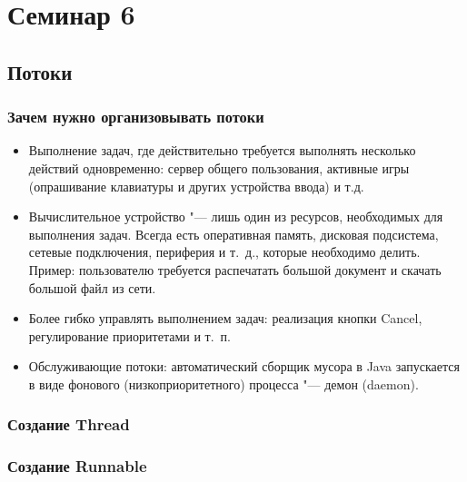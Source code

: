 \documentclass[default]{beamer}
\begin{document}
	\section{Семинар 6}
	\subsection{Потоки}
	\begin{frame}
		\frametitle{Зачем нужно организовывать потоки}
		
		\begin{itemize}
			\item Выполнение задач, где действительно требуется выполнять несколько действий одновременно: сервер общего пользования, активные игры (опрашивание клавиатуры и других устройства ввода) и т.д.
			\item Вычислительное устройство "--- лишь один из ресурсов, необходимых для выполнения задач. Всегда есть оперативная память, дисковая подсистема, сетевые подключения, периферия и т.~д., которые необходимо делить. Пример: пользователю требуется распечатать большой документ и скачать большой файл из сети.
			\item Более гибко управлять выполнением задач: реализация кнопки Cancel, регулирование приоритетами и т.~п.
			\item Обслуживающие потоки: автоматический сборщик мусора в Java запускается в виде фонового (низкоприоритетного) процесса "--- демон (daemon).
		\end{itemize}
	\end{frame}

	\begin{frame}
		\frametitle{Создание Thread}
		
		\lstThread
	\end{frame}

	\begin{frame}
		\frametitle{Создание Runnable}
		
		\lstRunnable
	\end{frame}
\end{document}
